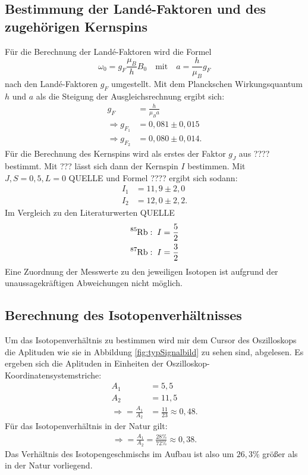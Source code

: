\subsection{Bestimmung der Landé-Faktoren und des zugehörigen Kernspins}
Für die Berechnung der Landé-Faktoren wird die Formel
\begin{equation}
  \omega_0=g_F\frac{\mu_B}{h}B_0\quad \text{mit}\quad a=\frac{h}{\mu_B}{g_F}
\end{equation}
nach den Landé-Faktoren $g_F$ umgestellt. Mit dem Planckschen Wirkungsquantum $h$ und $a$ als die Steigung der Ausgleichsrechnung ergibt sich:
\begin{align*}
  g_F&=\frac{h}{\mu_Ba}\\
  \Rightarrow g_{F_1}&= 0,081 \pm 0,015\\
  \Rightarrow g_{F_2}&= 0,080 \pm 0,014.
\end{align*}
Für die Berechnung des Kernspins wird als erstes der Faktor $g_J$ aus ???? bestimmt. Mit ??? lässt sich dann der Kernspin $I$ bestimmen. Mit $J,S=0,5,L=0$ QUELLE und Formel ???? ergibt sich sodann:
\begin{align*}
  I_1&= 11,9\pm2,0\\
  I_2&=12,0\pm2,2.
\end{align*}
Im Vergleich zu den Literaturwerten QUELLE
\begin{align*}
  \ce{^{85}Rb}&:\; I=\frac{5}{2}\\
  \ce{^{87}Rb}&:\; I=\frac{3}{2}
\end{align*}
Eine Zuordnung der Messwerte zu den jeweiligen Isotopen ist aufgrund der unaussagekräftigen Abweichungen nicht möglich.
\subsection{Berechnung des Isotopenverhältnisses}
Um das Isotopenverhältnis zu bestimmen wird mir dem Cursor des Oszilloskops die Aplituden wie sie in Abbildung \ref{fig:typSignalbild} zu sehen sind, abgelesen.
Es ergeben sich die Aplituden in Einheiten der Oszilloskop-Koordinatensystemstriche:
\begin{align*}
A_1&= 5,5\\
A_2&= 11,5\\
\Rightarrow =\frac{A_1}{A_2}&=\frac{11}{23}\approx 0,48.
\end{align*}
Für das Isotopenverhältnis in der Natur gilt:
\begin{align*}
\Rightarrow =\frac{A_1}{A_2}=\frac{28\%}{72\%}\approx 0,38.
\end{align*}
Das Verhältnis des Isotopengeschmischs im Aufbau ist also um $26,3\%$ größer als in der Natur vorliegend.
